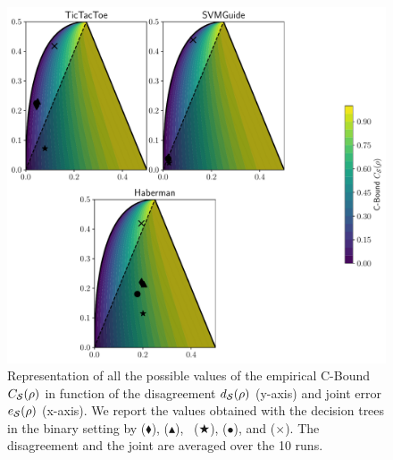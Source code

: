 \begin{noaddcontents}
\begin{figure}
    \centering
    \includegraphics[width=1.0\linewidth]{chapter_4/figures/cbound_tree_binary_2.pdf}
    \caption{
    Representation of all the possible values of the empirical C-Bound ${C}_{\mathcal{S}}(\rho)$ in function of the disagreement $d_{\mathcal{S}}(\rho)$ (y-axis) and joint error $e_{\mathcal{S}}(\rho)$ (x-axis).
We report the values obtained with the decision trees in the binary setting by  ($\blacklozenge$), \algomasegosa ($\blacktriangle$), \algogermain~($\bigstar$), \cbboost ($\bullet$), and \mincq ($\boldsymbol{\times}$).
The disagreement and the joint are averaged over the 10 runs.
    }
    \label{chap:mv:fig:cbound-tree-binary-2}
\end{figure}


\end{noaddcontents}
